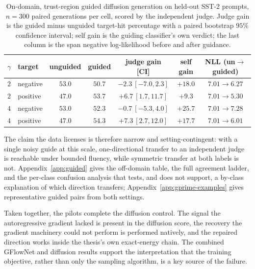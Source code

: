 \begin{table}[h]
    \centering
    \small
    \setlength{\tabcolsep}{4pt}
    \begin{tabular}{llccccc}
        \toprule
        $\gamma$ & target & unguided & guided & judge gain [CI] & self gain & NLL (un$\to$guided) \\
        \midrule
        $2$ & negative & $53.0$ & $50.7$ & $-2.3\ [-7.0, 2.3]$   & $+18.0$ & $7.01\to6.27$ \\
        $2$ & positive & $47.0$ & $53.7$ & $+6.7\ [1.7, 11.7]$   & $+9.3$  & $7.01\to5.30$ \\
        $4$ & negative & $53.0$ & $52.3$ & $-0.7\ [-5.3, 4.0]$   & $+25.7$ & $7.01\to7.28$ \\
        $4$ & positive & $47.0$ & $54.3$ & $+7.3\ [2.7, 12.0]$   & $+17.7$ & $7.01\to6.01$ \\
        \bottomrule
    \end{tabular}
    \caption[On-domain trust-region guided diffusion generation, held-out SST-2 prompts.]{On-domain, trust-region guided diffusion generation on held-out SST-2 prompts, $n=300$ paired generations per cell, scored by the independent judge. Judge gain is the guided minus unguided target-hit percentage with a paired bootstrap $95\%$ confidence interval; self gain is the guiding classifier's own verdict; the last column is the span negative log-likelihood before and after guidance.}
    \label{tab:gprime}
\end{table}

The claim the data licenses is therefore narrow and setting-contingent: with a single noisy guide at this scale, one-directional transfer to an independent judge is reachable under bounded fluency, while symmetric transfer at both labels is not. Appendix~\ref{app:guided} gives the off-domain table, the full agreement ladder, and the per-class confusion analysis that tests, and does not support, a by-class explanation of which direction transfers; Appendix~\ref{app:gprime-examples} gives representative guided pairs from both settings.

Taken together, the pilots complete the diffusion control. The signal the autoregressive gradient lacked is present in the diffusion score, the recovery the gradient machinery could not perform is performed natively, and the repaired direction works inside the thesis's own exact-energy chain. The combined GFlowNet and diffusion results support the interpretation that the training objective, rather than only the sampling algorithm, is a key source of the failure.
